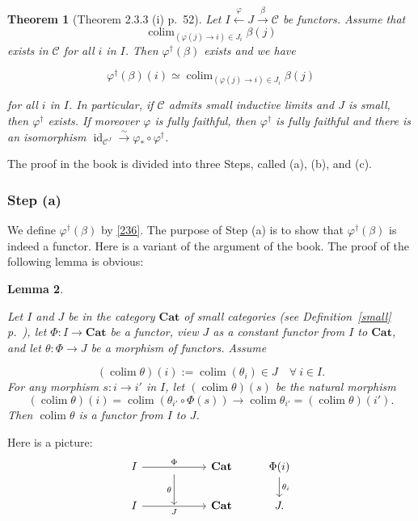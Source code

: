 \documentclass[12pt]{article}%
\newtheorem{thm}{Theorem}%
\newtheorem{lem}[thm]{Lemma}
\theoremstyle{remark}
\theoremstyle{definition}
\newcommand{\C}{\mathcal C}
\newcommand{\Cat}{\mathbf{Cat}}%
\newcommand{\xr}{\xrightarrow}
\DeclareMathOperator*{\colim}{colim}
\DeclareMathOperator{\id}{id}
\begin{document}
\begin{thm}[Theorem 2.3.3 (i) p.~52]\label{233i}
Let $I\xleftarrow\varphi J\xr\beta\C$ be functors. Assume that 
$$
\colim_{(\varphi(j)\to i)\in J_i}\beta(j)
$$ 
exists in $\C$ for all $i$ in $I$. Then $\varphi^\dagger(\beta)$ exists and we have 

\begin{equation}\label{236}
\varphi^\dagger(\beta)(i)\simeq\colim_{(\varphi(j)\to i)\in J_i}\beta(j)
\end{equation} 

for all $i$ in $I$. In particular, if $\C$ admits small inductive limits and $J$ is small, then 
$\varphi^\dagger$ exists. If moreover $\varphi$ is fully faithful, then $\varphi^\dagger$ is fully faithful and there is an isomorphism $\id_{\C^J}\xr\sim\varphi_*\circ\varphi^\dagger$. 
\end{thm}
The proof in the book is divided into three Steps, called (a), (b), and (c). 

\subsubsection{Step (a)}\label{scji}

We define $\varphi^\dagger(\beta)$ by \eqref{236}. The purpose of Step (a) is to show that $\varphi^\dagger(\beta)$ is indeed a functor. Here is a variant of the argument of the book. The proof of the following lemma is obvious: 

\begin{lem}\label{r52}

Let $I$ and $J$ be in the category $\Cat$ of small categories (see Definition~\ref{small} p.~\pageref{small}), let $\Phi:I\to\Cat$ be a functor, view $J$ as a constant functor from $I$ to $\Cat$, and let $\theta:\Phi\to J$ be a morphism of functors. Assume 

\begin{equation}\label{52} 
(\colim\theta)(i):=\colim(\theta_i)\in J\quad\forall\ i\in I. 
\end{equation} 
%
For any morphism $s:i\to i'$ in $I$, let $(\colim\theta)(s)$ be the natural morphism 
$$
(\colim\theta)(i)=\colim(\theta_{i'}\circ\Phi(s))\to
\colim\theta_{i'}=(\colim\theta)(i'). 
$$ 
Then $\colim\theta$ is a functor from $I$ to $J$. 
%
\end{lem}
%
Here is a picture:
$$
\begin{tikzcd}
I\ar{rr}{\Phi}&\ar{d}[swap]{\theta}&\Cat&\Phi(i)\ar{d}{\theta_i}\\ 
I\ar{rr}[swap]{J}&{}&\Cat&J.
\end{tikzcd}
$$
\end{document}
